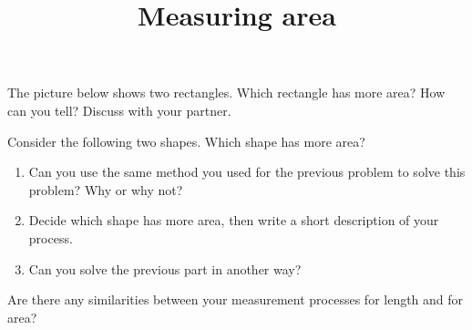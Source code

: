 \documentclass[nooutcomes,noauthor]{ximera}
\title{Measuring area}
\begin{document}
\begin{abstract}\end{abstract}
\maketitle



\begin{problem}


 The picture below shows two rectangles. Which rectangle has more area?  How can you tell?  Discuss with your partner.  
\begin{image}
\end{image}
\end{problem}

\pagebreak

\begin{problem}
Consider the following two shapes.  Which shape has more area?

\begin{image}
\end{image}
   
\begin{enumerate}
    \item Can you use the same method you used for the previous problem to solve this problem? Why or why not?
    \item Decide which shape has more area, then write a short description of your process.
    \item Can you solve the previous part in another way?

\end{enumerate}
\end{problem}

\pagebreak

\begin{problem}
Are there any similarities between your measurement processes for length and for area?
\end{problem}
\vskip 2in
\end{document}

